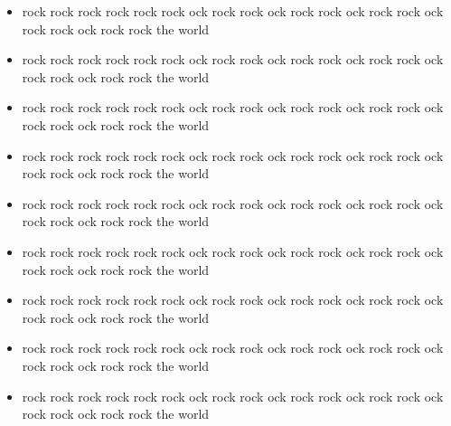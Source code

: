 \documentclass[10pt,a4paper]{sescv}
\begin{document}
\begin{minipage}[t]{0.75\textwidth} 


\begin{itemize}
\item rock rock rock rock rock rock ock rock rock ock rock rock ock rock rock ock rock rock ock rock rock the world
\item rock rock rock rock rock rock ock rock rock ock rock rock ock rock rock ock rock rock ock rock rock the world
\item rock rock rock rock rock rock ock rock rock ock rock rock ock rock rock ock rock rock ock rock rock the world
\end{itemize}

\divider

\begin{itemize}
\item rock rock rock rock rock rock ock rock rock ock rock rock ock rock rock ock rock rock ock rock rock the world
\item rock rock rock rock rock rock ock rock rock ock rock rock ock rock rock ock rock rock ock rock rock the world
\item rock rock rock rock rock rock ock rock rock ock rock rock ock rock rock ock rock rock ock rock rock the world
\end{itemize}

\divider

\begin{itemize}
\item rock rock rock rock rock rock ock rock rock ock rock rock ock rock rock ock rock rock ock rock rock the world
\item rock rock rock rock rock rock ock rock rock ock rock rock ock rock rock ock rock rock ock rock rock the world
\item rock rock rock rock rock rock ock rock rock ock rock rock ock rock rock ock rock rock ock rock rock the world
\end{itemize}

\end{minipage} 
\end{document}
